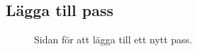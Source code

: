 \documentclass{article}
\begin{document}
{    \subsection{Lägga till pass}
        \begin{figure}
            \vspace{-15pt}
            \caption{Sidan för att lägga till ett nytt pass.}
            \label{fig:workoutAdd}

\end{figure}}
\end{document}
